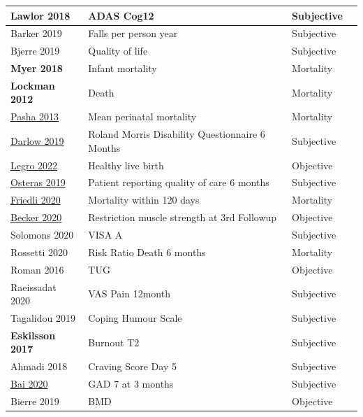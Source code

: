 \documentclass[sn-mathphys,Numbered]{sn-jnl}%
\begin{document}
\begin{longtable}{|p{3cm}|p{3.5cm}|p{3cm}|p{1.7cm}|}
\hline
Lawlor 2018 & ADAS Cog12 & Subjective & \cite{lawlor2018nilvadipine} \\
\hline
Barker 2019 & Falls per person year & Subjective & \cite{barker2019evaluation} \\
\hline
Bjerre 2019 & Quality of life & Subjective & \cite{bjerre2019community} \\
\hline
\textbf{Myer 2018} & Infant mortality & Mortality & \cite{myer2018integration} \\
\hline
\textbf{Lockman 2012} & Death & Mortality & \cite{lockman2012nevirapine} \\
\hline
\underline{Pasha 2013} & Mean perinatal mortality & Mortality & \cite{pasha2013combined} \\
\hline
\underline{Darlow 2019} & Roland Morris Disability Questionnaire 6 Months & Subjective & \cite{darlow2019fear} \\
\hline
\underline{Legro 2022} & Healthy live birth & Objective & \cite{legro2022effects} \\ %
\hline
\underline{Osteras 2019} & Patient reporting quality of care 6 months & Subjective & \cite{osteraas2019implementing} \\
\hline
\underline{Friedli 2020} & Mortality within 120 days & Mortality & \cite{friedli2020refeeding} \\
\hline
\underline{Becker 2020} & Restriction muscle strength at 3rd Followup & Objective & \cite{becker2020prevention} \\
\hline
Solomons 2020 & VISA A & Subjective & \cite{solomons2020intramuscular} \\
\hline
Rossetti 2020 & Risk Ratio Death 6 months & Mortality & \cite{rossetti2020continuous} \\
\hline
Roman 2016 & TUG & Objective & \cite{roman2016effects} \\
\hline
Raeissadat 2020 & VAS Pain 12month & Subjective & \cite{raeissadat2020platelet} \\
\hline
Tagalidou 2019 & Coping Humour Scale & Subjective & \cite{tagalidou2019efficacy} \\
\hline
\textbf{Eskilsson 2017} & Burnout T2 & Subjective & \cite{eskilsson2017aerobic} \\
\hline
Ahmadi 2018 & Craving Score Day 5 & Subjective & \cite{ahmadi2018single} \\
\hline
\underline{Bai 2020} & GAD 7 at 3 months & Subjective & \cite{bai2020randomised} \\
\hline
Bierre 2019 & BMD & Objective & \cite{bjerre2019community} \\

\end{longtable}
\end{document}
